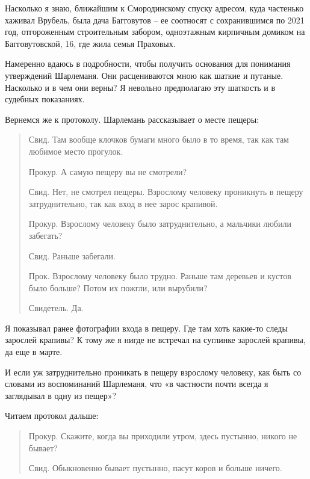 Насколько я знаю, ближайшим к Смородинскому спуску адресом, куда частенько хаживал Врубель, была дача Багговутов – ее соотносят с сохранившимся по 2021 год, отгороженным строительным забором, одноэтажным кирпичным домиком на Багговутовской, 16, где жила семья Праховых.

Намеренно вдаюсь в подробности, чтобы получить основания для понимания утверждений Шарлеманя. Они расцениваются мною как шаткие и путаные. Насколько и в чем они верны? Я невольно предполагаю эту шаткость и в судебных показаниях.


 
Вернемся же к протоколу. Шарлемань рассказывает о месте пещеры:

\begin{quotation}
Свид. Там вообще клочков бумаги много было в то время, так как там любимое место прогулок.

Прокур. А самую пещеру вы не смотрели?

Свид. Нет, не смотрел пещеры. Взрослому человеку проникнуть в пещеру затруднительно, так как вход в нее зарос крапивой.

Прокур. Взрослому человеку было затруднительно, а мальчики любили забегать? 

Свид. Раньше забегали.

Прок. Взрослому человеку было трудно. Раньше там деревьев и кустов было больше? Потом их пожгли, или вырубили?

Свидетель. Да.
\end{quotation}

Я показывал ранее фотографии входа в пещеру. Где там хоть какие-то следы зарослей крапивы? К тому же я нигде не встречал на суглинке зарослей крапивы, да еще в марте.

И если уж затруднительно проникать в пещеру взрослому человеку, как быть со словами из воспоминаний Шарлеманя, что «в частности почти всегда я заглядывал в одну из пещер»?

Читаем протокол дальше:

\begin{quotation}
Прокур. Скажите, когда вы приходили утром, здесь пустынно, никого не бывает?

Свид. Обыкновенно бывает пустынно, пасут коров и больше ничего.
\end{quotation}

